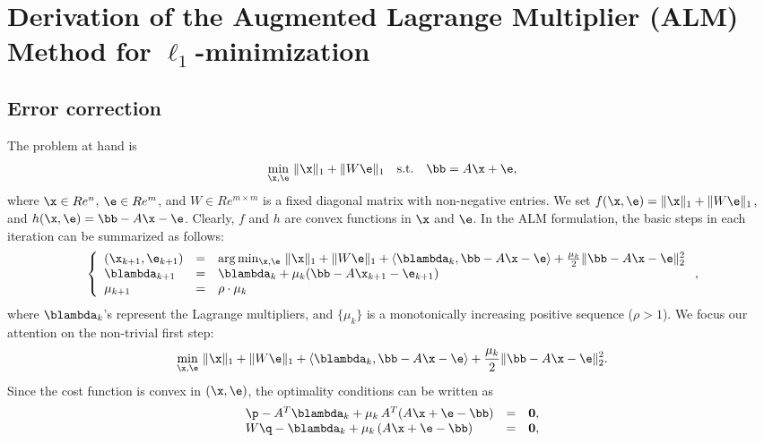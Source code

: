 \section{Derivation of the Augmented Lagrange Multiplier (ALM) Method for $\ell_1$-minimization}
\label{sec:alm_derivation}

\subsection{Error correction}

The problem at hand is 
\begin{equation}
\min_{\x,\e} \, \|\x\|_1 + \|W\e\|_1 \quad \mathrm{s.t.} \quad \bb = A\x + \e,
\end{equation}
where $\x \in Re^n$, $\e \in Re^m$, and $W \in Re^{m \times m}$ is a fixed diagonal matrix with non-negative entries. 
\smallbreak
We set $f(\x,\e) = \|\x\|_1 + \|W\e\|_1$, and $h(\x,\e) = \bb - A\x - \e$. Clearly, $f$ and $h$ are convex functions in $\x$ and $\e$. In the ALM formulation, the basic steps in each iteration can be summarized as follows:
\begin{equation}
\left \{ 
\begin{array}{lll}
(\x_{k+1},\e_{k+1}) & = & \arg\min_{\x,\e} \, \|\x\|_1 + \|W\e\|_1 + \langle \blambda_k, \bb - A\x - \e \rangle + \frac{\mu_k}{2}\|\bb - A\x - \e\|_2^2 \\
\blambda_{k+1} & = & \blambda_k + \mu_k (\bb - A\x_{k+1} - \e_{k+1}) \\
\mu_{k+1} & = & \rho\cdot\mu_k
\end{array} 
\right . ,
\end{equation}
where $\blambda_k$'s represent the Lagrange multipliers, and $\{\mu_k\}$ is a monotonically increasing positive sequence ($\rho > 1$).
\smallbreak
We focus our attention on the non-trivial first step:
\begin{equation}
\min_{\x,\e} \, \|\x\|_1 + \|W\e\|_1 + \langle \blambda_k, \bb - A\x - \e \rangle + \frac{\mu_k}{2}\|\bb - A\x - \e\|_2^2.
\label{eqn:alm}
\end{equation}
Since the cost function is convex in $(\x,\e)$, the optimality conditions can be written as
\begin{equation}
\begin{array}{lll}
\p - A^T\blambda_k + \mu_k\,A^T(A\x + \e - \bb) & = & \mathbf{0}, \\
W\q - \blambda_k + \mu_k\, (A\x + \e -\bb) & = & \mathbf{0},
\end{array}
\end{equation}
